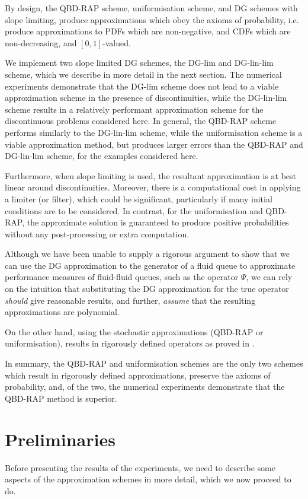 By design, the QBD-RAP scheme, uniformisation scheme, and DG schemes with slope limiting, produce approximations which obey the axioms of probability, i.e. produce approximations to PDFs which are non-negative, and CDFs which are non-decreasing, and \([0,1]\)-valued.  

We implement two slope limited DG schemes, the DG-lim and DG-lin-lim scheme, which we describe in more detail in the next section. The numerical experiments demonstrate that the DG-lim scheme does not lead to a viable approximation scheme in the presence of discontinuities, while the DG-lin-lim scheme results in a relatively performant approximation scheme for the discontinuous problems considered here. In general, the QBD-RAP scheme performs similarly to the DG-lin-lim scheme, while the uniformisation scheme is a viable approximation method, but produces larger errors than the QBD-RAP and DG-lin-lim scheme, for the examples considered here. 

Furthermore, when slope limiting is used, the resultant approximation is at best linear around discontinuities. Moreover, there is a computational cost in applying a limiter (or filter), which could be significant, particularly if many initial conditions are to be considered. In contrast, for the uniformisation and QBD-RAP, the approximate solution is guaranteed to produce positive probabilities without any post-processing or extra computation. 

Although we have been unable to supply a rigorous argument to show that we can use the DG approximation to the generator of a fluid queue to approximate performance measures of fluid-fluid queues, such as the operator \(\mathbb \Psi\), we can rely on the intuition that substituting the DG approximation for the true operator \emph{should} give reasonable results, and further, \emph{assume} that the resulting approximations are polynomial.

On the other hand, using the stochastic approximations (QBD-RAP or uniformisation), results in rigorously defined operators as proved in \cite{bgnp2021}.

In summary, the QBD-RAP and uniformisation schemes are the only two schemes which result in rigorously defined approximations, preserve the axioms of probability, and, of the two, the numerical experiments demonstrate that the QBD-RAP method is superior. 

\section{Preliminaries}
Before presenting the results of the experiments, we need to describe some aspects of the approximation schemes in more detail, which we now proceed to do. 

